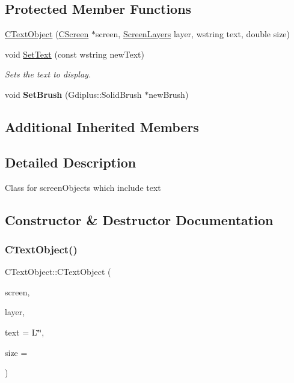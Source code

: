 \subsection*{Protected Member Functions}
\begin{DoxyCompactItemize}
\item 
\mbox{\hyperlink{class_c_text_object_a271093e58df49cce685e4ed388a41606}{C\+Text\+Object}} (\mbox{\hyperlink{class_c_screen}{C\+Screen}} $\ast$screen, \mbox{\hyperlink{_screen_layers_8h_ac283065f0e546466dc00cf224c28d5ac}{Screen\+Layers}} layer, wstring text, double size)
\item 
\mbox{\label{class_c_text_object_a04cc77705f158b9a9bb767103346630b}} 
void \mbox{\hyperlink{class_c_text_object_a04cc77705f158b9a9bb767103346630b}{Set\+Text}} (const wstring new\+Text)
\begin{DoxyCompactList}\small\item\em Sets the text to display. \end{DoxyCompactList}\item 
\mbox{\label{class_c_text_object_a623070e9b808c4898cc101c247fc6a3c}} 
void {\bfseries Set\+Brush} (Gdiplus\+::\+Solid\+Brush $\ast$new\+Brush)
\end{DoxyCompactItemize}
\subsection*{Additional Inherited Members}


\subsection{Detailed Description}
Class for screen\+Objects which include text 

\subsection{Constructor \& Destructor Documentation}
\mbox{\label{class_c_text_object_a271093e58df49cce685e4ed388a41606}} 
\subsubsection{\texorpdfstring{CTextObject()}{CTextObject()}}
{\footnotesize\ttfamily C\+Text\+Object\+::\+C\+Text\+Object (\begin{DoxyParamCaption}\item[{\mbox{\hyperlink{class_c_screen}{C\+Screen}} $\ast$}]{screen,  }\item[{\mbox{\hyperlink{_screen_layers_8h_ac283065f0e546466dc00cf224c28d5ac}{Screen\+Layers}}}]{layer,  }\item[{wstring}]{text = {\ttfamily L\char`\"{}\char`\"{}},  }\item[{double}]{size = {} }\end{DoxyParamCaption})\hspace{0.3cm}{\ttfamily [protected]}}

